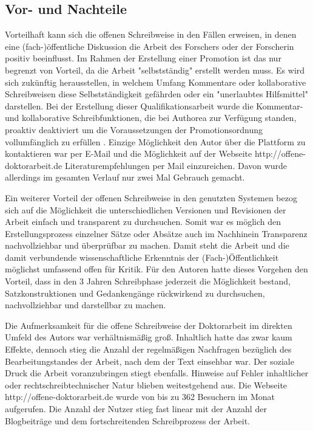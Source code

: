 \subsection{Vor- und Nachteile}

Vorteilhaft kann sich die offenen Schreibweise in den Fällen erweisen, in denen eine (fach-)öffentliche Diskussion die Arbeit des Forschers oder der Forscherin positiv beeinflusst. Im Rahmen der Erstellung einer Promotion ist das nur begrenzt von Vorteil, da die Arbeit "selbstständig" \cite{promotionsordnung_leuphana_kuwi_2011} erstellt werden muss. Es wird sich zukünftig herausstellen, in welchem Umfang Kommentare oder kollaborative Schreibweisen diese Selbstständigkeit gefährden oder ein "unerlaubtes Hilfsmittel" \cite{promotionsordnung_leuphana_kuwi_2011} darstellen. Bei der Erstellung dieser Qualifikationsarbeit wurde die Kommentar- und kollaborative Schreibfunktionen, die bei Authorea zur Verfügung standen, proaktiv deaktiviert um die Voraussetzungen der Promotionsordnung vollumfänglich zu erfüllen \cite{heise_2013_schreiben_kommission}. Einzige Möglichkeit den Autor über die Plattform zu kontaktieren war per E-Mail und die Möglichkeit auf der Webseite http://offene-doktorarbeit.de Literaturempfehlungen per Mail einzureichen. Davon wurde allerdings im gesamten Verlauf nur zwei Mal Gebrauch gemacht.

Ein weiterer Vorteil der offenen Schreibweise in den genutzten Systemen bezog sich auf die Möglichkeit die unterschiedlichen Versionen und Revisionen der Arbeit einfach und transparent zu durchsuchen. Somit war es möglich den Erstellungsprozess einzelner Sätze oder Absätze auch im Nachhinein Transparenz nachvollziehbar und überprüfbar zu machen. Damit steht die Arbeit und die damit verbundende wissenschaftliche Erkenntnis der (Fach-)Öffentlichkeit möglichst umfassend offen für Kritik. Für den Autoren hatte dieses Vorgehen den Vorteil, dass in den 3 Jahren Schreibphase jederzeit die Möglichkeit bestand, Satzkonstruktionen und Gedankengänge rückwirkend zu durchsuchen, nachvollziehbar und darstellbar zu machen.

Die Aufmerksamkeit für die offene Schreibweise der Doktorarbeit im direkten Umfeld des Autors war verhältnismäßig groß. Inhaltlich hatte das zwar kaum Effekte, dennoch stieg die Anzahl der regelmäßigen Nachfragen bezüglich des Bearbeitungstandes der Arbeit, nach dem der Text einsehbar war. Der soziale Druck die Arbeit voranzubringen stiegt ebenfalls. Hinweise auf Fehler inhaltlicher oder rechtschreibtechnischer Natur blieben weitestgehend aus. Die Webseite http://offene-doktorarbeit.de wurde von bis zu 362 Besuchern im Monat aufgerufen. Die Anzahl der Nutzer stieg fast linear mit der Anzahl der Blogbeiträge und dem fortschreitenden Schreibprozess der Arbeit.

